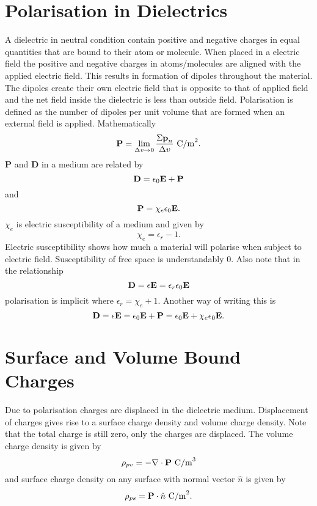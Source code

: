 \documentclass[12pt,a4paper]{article}
\begin{document}
\section{Polarisation in Dielectrics}
A dielectric in neutral condition contain positive and negative charges in equal quantities that are bound to their atom or molecule. When placed in a electric field the positive and negative charges in atoms/molecules are aligned with the applied electric field. This results in formation of dipoles throughout the material. The dipoles create their own electric field that is opposite to that of applied field and the net field inside the dielectric is less than outside field. Polarisation is defined as the number of dipoles per unit volume that are formed when an external field is applied. Mathematically
\begin{equation}
\mathrm{\textbf P}=\lim_{\Delta v \to 0}\dfrac{\Sigma\mathrm{\textbf p}_n}{\Delta v}~\mathrm{C/m}^2.
\end{equation}
\textbf{P} and \textbf{D} in a medium are related by
\begin{equation}
\mathrm{\textbf D}=\epsilon_0\mathrm{\textbf E}+\mathrm{\textbf P}
\end{equation}
and
\begin{equation}
\mathrm{\textbf P}=\chi_e\epsilon_0\mathrm{\textbf E}.
\end{equation}
$\chi_e$ is electric susceptibility of a medium and given by
\begin{equation}
\chi_e=\epsilon_r-1.
\end{equation}
Electric susceptibility shows how much a material will polarise when subject to electric field. Susceptibility of free space is understandably 0. Also note that in the relationship
\begin{equation}
\mathrm{\textbf D}=\epsilon\mathrm{\textbf E}=\epsilon_r\epsilon_0\mathrm{\textbf E}
\end{equation}
polarisation is implicit where $\epsilon_r=\chi_e+1$. Another way of writing this is
\begin{equation}
\mathrm{\textbf D}=\epsilon\mathrm{\textbf E}=\epsilon_0\mathrm{\textbf E}+\mathrm{\textbf P}=\epsilon_0\mathrm{\textbf E}+\chi_e\epsilon_0\mathrm{\textbf E}.
\end{equation}
\section{Surface and Volume Bound Charges}
Due to polarisation charges are displaced in the dielectric medium. Displacement of charges gives rise to a surface charge density and volume charge density. Note that the total charge is still zero, only the charges are displaced. The volume charge density is given by
\begin{equation}
\rho_{pv}=-\nabla\cdot\mathrm{\textbf P}~\mathrm{C/m}^3
\end{equation}
and surface charge density on any surface with normal vector $\hat n$ is given by
\begin{equation}
\rho_{ps}=\mathrm{\textbf P}\cdot\hat n~\mathrm{C/m}^2.
\end{equation}
\end{document}
